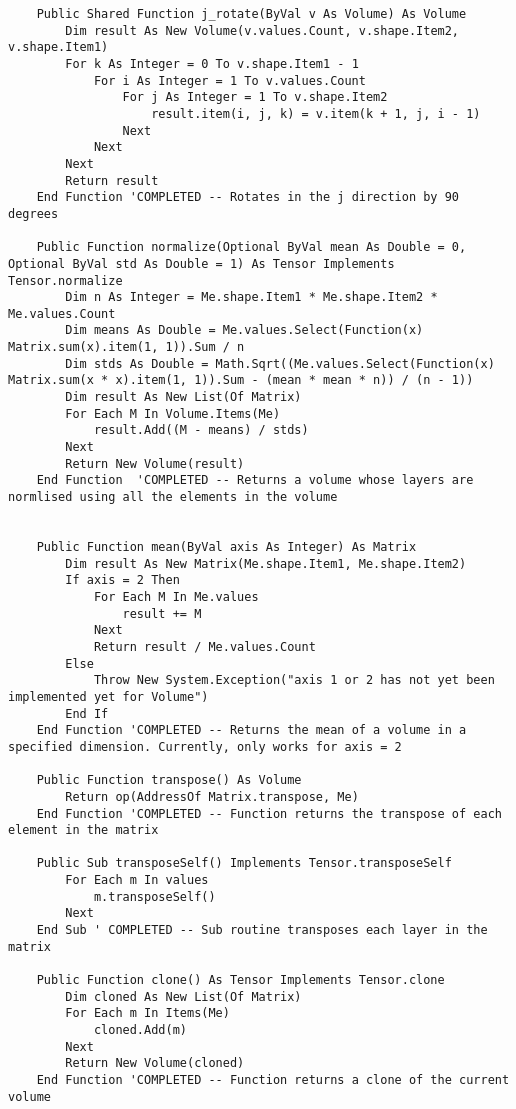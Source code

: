 \begin{verbatim}
    Public Shared Function j_rotate(ByVal v As Volume) As Volume
        Dim result As New Volume(v.values.Count, v.shape.Item2, v.shape.Item1)
        For k As Integer = 0 To v.shape.Item1 - 1
            For i As Integer = 1 To v.values.Count
                For j As Integer = 1 To v.shape.Item2
                    result.item(i, j, k) = v.item(k + 1, j, i - 1)
                Next
            Next
        Next
        Return result
    End Function 'COMPLETED -- Rotates in the j direction by 90 degrees

    Public Function normalize(Optional ByVal mean As Double = 0, Optional ByVal std As Double = 1) As Tensor Implements Tensor.normalize
        Dim n As Integer = Me.shape.Item1 * Me.shape.Item2 * Me.values.Count
        Dim means As Double = Me.values.Select(Function(x) Matrix.sum(x).item(1, 1)).Sum / n
        Dim stds As Double = Math.Sqrt((Me.values.Select(Function(x) Matrix.sum(x * x).item(1, 1)).Sum - (mean * mean * n)) / (n - 1))
        Dim result As New List(Of Matrix)
        For Each M In Volume.Items(Me)
            result.Add((M - means) / stds)
        Next
        Return New Volume(result)
    End Function  'COMPLETED -- Returns a volume whose layers are normlised using all the elements in the volume


    Public Function mean(ByVal axis As Integer) As Matrix
        Dim result As New Matrix(Me.shape.Item1, Me.shape.Item2)
        If axis = 2 Then
            For Each M In Me.values
                result += M
            Next
            Return result / Me.values.Count
        Else
            Throw New System.Exception("axis 1 or 2 has not yet been implemented yet for Volume")
        End If
    End Function 'COMPLETED -- Returns the mean of a volume in a specified dimension. Currently, only works for axis = 2

    Public Function transpose() As Volume
        Return op(AddressOf Matrix.transpose, Me)
    End Function 'COMPLETED -- Function returns the transpose of each element in the matrix

    Public Sub transposeSelf() Implements Tensor.transposeSelf
        For Each m In values
            m.transposeSelf()
        Next
    End Sub ' COMPLETED -- Sub routine transposes each layer in the matrix

    Public Function clone() As Tensor Implements Tensor.clone
        Dim cloned As New List(Of Matrix)
        For Each m In Items(Me)
            cloned.Add(m)
        Next
        Return New Volume(cloned)
    End Function 'COMPLETED -- Function returns a clone of the current volume


\end{verbatim}
